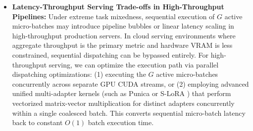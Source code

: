 \begin{itemize}
    \begin{enumerate}
        \item \emph{Dynamic Fallback to Hard Top-1 Routing ($k=1$):} Under extreme latency limits where only a single forward pass ($G=1$) is permitted, the router can dynamically enforce $k=1$. This mathematically guarantees a single forward pass per batch, completely eliminating sequential MBH overhead while preserving zero-shot task-specialized parameters.
        \item \emph{Adaptive Confidence Gating:} Instead of routing to all experts with non-zero similarity, practitioners can apply an entropy-based or margin-based similarity threshold to filter out low-confidence experts on the fly. This dynamically caps the active micro-batches to a minimal set ($G \le 2$) under heterogeneous mixtures.
        \item \emph{Temporal Batch Amortization (Task Grouping):} By accumulating incoming samples into slightly larger, less frequent batch chunks, the fixed computational costs of similarity projection and LoRA weight-merging are amortized over a larger sample set, substantially boosting edge CPU throughput.
    \end{enumerate}
    \item \textbf{Latency-Throughput Serving Trade-offs in High-Throughput Pipelines:} Under extreme task mixedness, sequential execution of $G$ active micro-batches may introduce pipeline bubbles or linear latency scaling in high-throughput production servers. In cloud serving environments where aggregate throughput is the primary metric and hardware VRAM is less constrained, sequential dispatching can be bypassed entirely. For high-throughput serving, we can optimize the execution path via parallel dispatching optimizations: (1) executing the $G$ active micro-batches concurrently across separate GPU CUDA streams, or (2) employing advanced unified multi-adapter kernels (such as Punica \cite{Punica2023} or S-LoRA \cite{SLoRA2024}) that perform vectorized matrix-vector multiplication for distinct adapters concurrently within a single coalesced batch. This converts sequential micro-batch latency back to constant $O(1)$ batch execution time.


\end{itemize}
